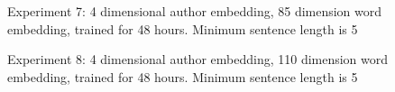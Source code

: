 \documentclass{article}%
\begin{document}
\begin{figure}
\noindent{}
\caption{Experiment 7: 4 dimensional author embedding, 85 dimension word embedding, trained for 48 hours. Minimum sentence length is 5}
\end{figure}
\begin{figure}
\noindent{}
\caption{Experiment 8: 4 dimensional author embedding, 110 dimension word embedding, trained for 48 hours. Minimum sentence length is 5}
\end{figure}
\end{document}
